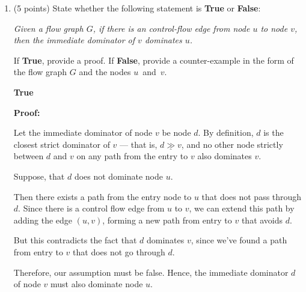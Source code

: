 \documentclass[12pt]{article}
\newcommand{\dom}{\underline{\gg}}
\begin{document}
\begin{enumerate}
\begin{mdframed}
      \end{mdframed}

      \clearpage
      \item (5 points) State whether the following statement is \textbf{True} or
      \textbf{False}: 

        \emph{Given a flow graph $G$, if there is an control-flow edge from node
        $u$ to node $v$, then the immediate dominator of $v$ dominates $u$.}

      If \textbf{True}, provide a proof.
      If \textbf{False}, provide a counter-example in the form of the flow graph
      $G$ and the nodes $u$~and~$v$.
      \begin{mdframed}
        \textbf{True} 

        \textbf{Proof:}

        Let the immediate dominator of node $v$ be node $d$. By definition, $d$ is the closest strict dominator of $v$ — that is, $d \dom v$, and no other node strictly between $d$ and $v$ on any path from the entry to $v$ also dominates $v$.

        Suppose, that $d$ does not dominate node $u$.

        Then there exists a path from the entry node to $u$ that does not pass through $d$. Since there is a control flow edge from $u$ to $v$, we can extend this path by adding the edge $(u, v)$, forming a new path from entry to $v$ that avoids $d$.

        But this contradicts the fact that $d$ dominates $v$, since we’ve found a path from entry to $v$ that does not go through $d$.

        Therefore, our assumption must be false. Hence, the immediate dominator $d$ of node $v$ must also dominate node $u$.
      \end{mdframed}


\end{enumerate}
\end{document}
